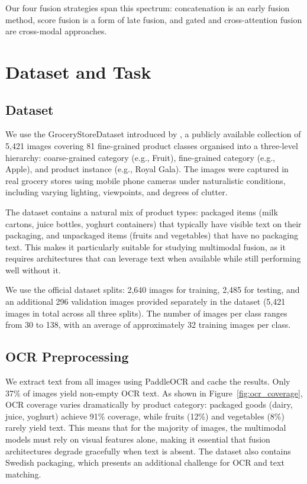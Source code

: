 \documentclass{article}
\begin{document}
Our four fusion strategies span this spectrum: concatenation is an early fusion method, score fusion is a form of late fusion, and gated and cross-attention fusion are cross-modal approaches.

\section{Dataset and Task}
\label{sec:dataset}

\subsection{Dataset}

We use the GroceryStoreDataset introduced by \citet{klasson2019hierarchical}, a publicly available collection of 5,421 images covering 81 fine-grained product classes organised into a three-level hierarchy: coarse-grained category (e.g., Fruit), fine-grained category (e.g., Apple), and product instance (e.g., Royal Gala). The images were captured in real grocery stores using mobile phone cameras under naturalistic conditions, including varying lighting, viewpoints, and degrees of clutter.

The dataset contains a natural mix of product types: packaged items (milk cartons, juice bottles, yoghurt containers) that typically have visible text on their packaging, and unpackaged items (fruits and vegetables) that have no packaging text. This makes it particularly suitable for studying multimodal fusion, as it requires architectures that can leverage text when available while still performing well without it.

We use the official dataset splits: 2,640 images for training, 2,485 for testing, and an additional 296 validation images provided separately in the dataset (5,421 images in total across all three splits). The number of images per class ranges from 30 to 138, with an average of approximately 32 training images per class.

\subsection{OCR Preprocessing}

We extract text from all images using PaddleOCR and cache the results. Only 37\% of images yield non-empty OCR text. As shown in Figure~\ref{fig:ocr_coverage}, OCR coverage varies dramatically by product category: packaged goods (dairy, juice, yoghurt) achieve 91\% coverage, while fruits (12\%) and vegetables (8\%) rarely yield text. This means that for the majority of images, the multimodal models must rely on visual features alone, making it essential that fusion architectures degrade gracefully when text is absent. The dataset also contains Swedish packaging, which presents an additional challenge for OCR and text matching.
\end{document}
